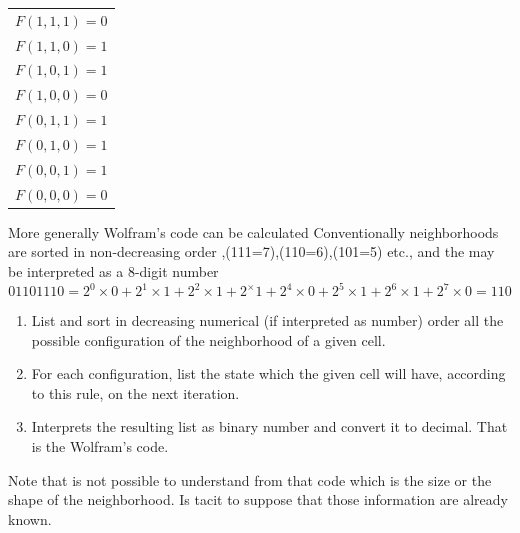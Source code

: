 \begin{table}
\begin{tabular}{l}
\label{wolframcoderule}
\hfill \\
\hline
  \begin{math}F(1,1,1)=0\end{math}  \\
  \begin{math}F(1,1,0)=1\end{math}  \\
  \begin{math}F(1,0,1)=1\end{math}  \\
  \begin{math}F(1,0,0)=0\end{math}  \\
  \begin{math}F(0,1,1)=1\end{math}  \\
  \begin{math}F(0,1,0)=1\end{math}  \\
  \begin{math}F(0,0,1)=1\end{math}  \\
  \begin{math}F(0,0,0)=0\end{math}  \\
\hline
\end{tabular}
\end{table}

More generally Wolfram's code\cite{wolfram1983,wolfram2002} can be calculated 
Conventionally neighborhoods are sorted in non-decreasing order
,(111=7),(110=6),(101=5) etc., and the may be interpreted as a 8-digit number
\[01101110=2^0\times0+2^1\times1+2^2\times1+2^\times1+2^4\times0+2^5\times1+2^6\times1+2^7\times0=110\]


\begin{enumerate}
  \item List and sort in decreasing numerical (if interpreted as number) order
  all the possible configuration of the neighborhood of a given cell.
  \item For each configuration, list the state which the given cell will have,
  according to this rule, on the next iteration.
  \item Interprets the resulting list as binary number and convert it to
  decimal. That  is the Wolfram's code.
\end{enumerate}

Note that is not possible to understand from that code which is the size or the
shape of the neighborhood. Is tacit to suppose that those information are
already known.


